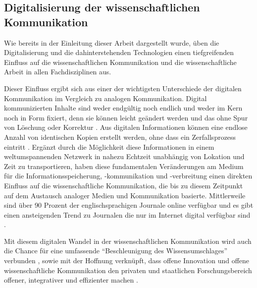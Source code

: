\subsection{Digitalisierung der wissenschaftlichen Kommunikation}

Wie bereits in der Einleitung dieser Arbeit dargestellt wurde, üben die Digitalisierung und die dahinterstehenden Technologien einen tiefgreifenden Einfluss auf die wissenschaftlichen Kommunikation und die wissenschaftliche Arbeit in allen Fachdisziplinen aus.

Dieser Einfluss ergibt sich aus einer der wichtigsten Unterschiede der digitalen Kommunikation im Vergleich zu analogen Kommunikation. Digital kommunizierten Inhalte sind weder endgültig noch endlich und weder im Kern noch in Form fixiert, denn sie können leicht geändert werden und das ohne Spur von Löschung oder Korrektur \cite{http://files.eric.ed.gov/fulltext/ED427787.pdf}. Aus digitalen Informationen können eine endlose Anzahl von identischen Kopien erstellt werden, ohne dass ein Zerfallsprozess eintritt \cite{http://files.eric.ed.gov/fulltext/ED427787.pdf}. Ergänzt durch die Möglichkeit diese Informationen in einem weltumspannenden Netzwerk in nahezu Echtzeit unabhängig von Lokation und Zeit zu transportieren, haben diese fundamentalen Veränderungen am Medium für die Informationsspeicherung, -kommunikation und -verbreitung einen direkten Einfluss auf die wissenschaftliche Kommunikation, die bis zu diesem Zeitpunkt auf dem Austausch analoger Medien und Kommunikation basierte. Mittlerweile sind über 90 Prozent der englischsprachigen Journale online verfügbar und es gibt einen ansteigenden Trend zu Journalen die nur im Internet digital verfügbar sind \cite{cope2014future}.

Mit diesem digitalen Wandel in der wissenschaftlichen Kommunikation wird auch die Chance für eine umfassende “Beschleunigung des Wissensumschlages” verbunden \cite{Wenzel_2003}, sowie mit der Hoffnung verknüpft, dass offene Innovation und offene wissenschaftliche Kommunikation den privaten und staatlichen Forschungsbereich offener, integrativer und effizienter machen \cite{suchen}.

